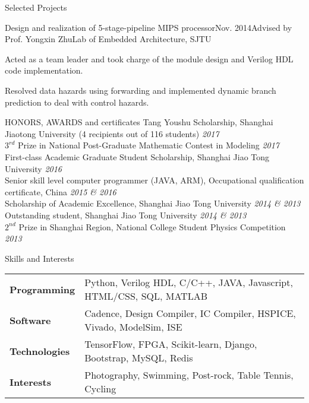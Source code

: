 \documentclass{resume_Stanford} %
\begin{document}
\begin{rSection}{Selected Projects}
\begin{rSubsection}{Design and realization of 5-stage-pipeline MIPS processor}{Nov. 2014}{Advised by Prof. Yongxin Zhu}{Lab of Embedded Architecture, SJTU}
\item Acted as a team leader and took charge of the module design and Verilog HDL code implementation. 
\item Resolved data hazards using forwarding and implemented dynamic branch prediction to deal with control hazards.
\end{rSubsection}
\end{rSection}

\begin{rSection}{HONORS, AWARDS and certificates}
Tang Youshu Scholarship, Shanghai Jiaotong University (4 recipients out of 116 students) \hfill \emph{2017}
\\$3^{rd}$ Prize in National Post-Graduate Mathematic Contest in Modeling \hfill \emph{2017}
\\First-class Academic Graduate Student Scholarship, Shanghai Jiao Tong University  \hfill \emph{2016}
\\Senior skill level computer programmer (JAVA, ARM), Occupational qualification certificate, China \hfill \emph{2015 \& 2016}
\\Scholarship of Academic Excellence, Shanghai Jiao Tong University \hfill \emph{2014 \& 2013}
\\Outstanding student, Shanghai Jiao Tong University \hfill \emph{2014 \& 2013}
\\$2^{nd}$ Prize in Shanghai Region, National College Student Physics Competition \hfill \emph{2013}
\end{rSection}

\begin{rSection}{Skills and Interests}
\begin{tabular}{ll}
\textbf{Programming \qquad} & Python, Verilog HDL, C/C++, JAVA, Javascript, HTML/CSS, SQL, MATLAB\\
\textbf{Software} & Cadence, Design Compiler, IC Compiler, HSPICE, Vivado, ModelSim, ISE\\
\textbf{Technologies} & TensorFlow, FPGA, Scikit-learn, Django, Bootstrap, MySQL, Redis\\
\textbf{Interests} & Photography, Swimming, Post-rock, Table Tennis, Cycling\\
\end{tabular}
\end{rSection}
\end{document}
